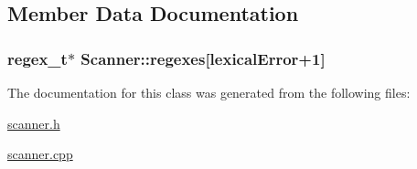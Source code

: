 \subsection{Member Data Documentation}
\hypertarget{classScanner_ae191d1d2c5a19bac9e921703fb3a49e5}{
\subsubsection[{regexes}]{\setlength{\rightskip}{0pt plus 5cm}regex\-\_\-t$\ast$ Scanner\-::regexes\mbox{[}{\bf lexical\-Error}+1\mbox{]}}}\label{classScanner_ae191d1d2c5a19bac9e921703fb3a49e5}


The documentation for this class was generated from the following files\-:\begin{DoxyCompactItemize}
\item 
\hyperlink{scanner_8h}{scanner.\-h}\item 
\hyperlink{scanner_8cpp}{scanner.\-cpp}\end{DoxyCompactItemize}
